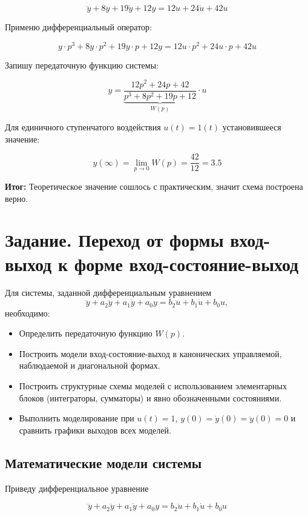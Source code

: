 \documentclass[a4paper,12pt]{article}
\begin{document}
	\[\dddot{y} + 8\ddot{y} + 19\dot{y} + 12y = 12\ddot{u} +24\dot{u} + 42u\]
	
	Применю дифференциальный оператор:
	
	\[y \cdot p^3 + 8 y \cdot p^2+ 19  y \cdot p + 12 y = 12 u \cdot p^2  + 24 u \cdot p + 42u\]
	
	Запишу передаточную функцию системы:
	
	\[
	y = \underbrace{\frac{12 p^2 + 24 p + 42}{p^3 + 8 p^2 + 19 p + 12}}_{\textstyle W(p)} \cdot u
	\]


	Для единичного ступенчатого воздействия $u(t) = 1(t)$ установившееся значение:
	
	\[
	y(\infty) = \lim_{p \to 0} W(p) = \frac{42}{12} = 3.5
	\]
	
	\textbf{Итог: }Теоретическое значение сошлось с практическим, значит схема построена верно.
	
	\newpage
	
	\section{Задание. Переход от формы вход-выход к форме вход-состояние-выход}
	
	Для системы, заданной дифференциальным уравнением
	\[
	\dddot{y} + a_2 \ddot{y} + a_1 \dot{y} + a_0 y = b_2 \ddot{u} + b_1 \dot{u} + b_0 u,
	\]
	необходимо:
	
	\begin{itemize}
		\item Определить передаточную функцию \(W(p)\).
		\item Построить модели вход-состояние-выход в канонических управляемой, наблюдаемой и диагональной формах.
		\item Построить структурные схемы моделей с использованием элементарных блоков (интеграторы, сумматоры) и явно обозначенными состояниями.
		\item Выполнить моделирование при \(u(t) = 1\), \(y(0) = \dot{y}(0) = \ddot{y}(0) = 0\) и сравнить графики выходов всех моделей.
	\end{itemize}
	
	\subsection{Математические модели системы}
	
	Приведу дифференциальное уравнение 
	
		\[\dddot{y} + a_2\ddot{y} + a_1\dot{y} + a_0y = b_2\ddot{u} + b_1\dot{u} + b_0u\]
	
\end{document}
